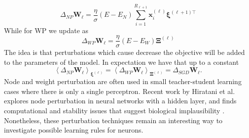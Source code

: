 \documentclass{article}
\def\*#1{\mathbf{#1}}
\begin{document}
\[ \Delta_{NP} \*W_{\ell} =\frac{\eta}{\sigma} (E-E_N) \sum_{i=1}^{R_{\ell+1}} \*x^{(\ell)}_i \* \xi^{(\ell+1)\top} \]
While for WP we update as
\[ \Delta_{WP} \*W_{\ell} = \frac{\eta}{\sigma} (E-E_W) \* \Xi^{(\ell)} \]
 The idea is that perturbations which cause decrease the objective will be added to 
 the parameters of the model. In expectation we have that up to a constant
\[ \left\langle \Delta_{NP}\*W_{\ell} \right\rangle_{\*\xi^{(\ell)}}= \left\langle \Delta_{WP}\*W_{\ell} \right\rangle_{\*\Xi^{(\ell)}} =  \Delta_{SGD}\*W_{\ell}.\]
Node and weight perturbation are often used in small teacher-student learning cases 
where there is only a single perceptron. Recent work by Hiratani et al. explores node perturbation
in neural networks with a hidden layer, and finds computational and stability issues that
suggest biological implausibility \cite{hiratani2022on}. Nonetheless, these perturbation techniques remain an interesting way
to investigate possible learning rules for neurons. 
\end{document}
